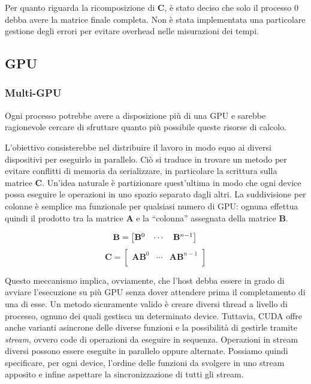 \documentclass[a4paper]{article}
\begin{document}
Per quanto riguarda la ricomposizione di $\mathbf{C}$, è stato deciso che solo il processo 0 debba avere la matrice finale completa.
Non è stata implementata una particolare gestione degli errori per evitare overhead nelle misurazioni dei tempi.

\subsection{GPU}
\subsubsection{Multi-GPU}
Ogni processo potrebbe avere a disposizione più di una GPU e sarebbe ragionevole cercare di sfruttare quanto più possibile queste risorse di calcolo.

L'obiettivo consisterebbe nel distribuire il lavoro in modo equo ai diversi dispositivi per eseguirlo in parallelo. Ciò si traduce in trovare un metodo per evitare conflitti di memoria da serializzare, in particolare la scrittura sulla matrice $\mathbf{C}$. Un'idea naturale è partizionare quest'ultima in modo che ogni device possa eseguire le operazioni in uno spazio separato dagli altri.
La suddivisione per colonne è semplice ma funzionale per qualsiasi numero di GPU: ognuna effettua quindi il prodotto tra la matrice $\mathbf{A}$ e la ``colonna'' assegnata della matrice $\mathbf{B}$.

$$
    \mathbf{B}=
    \begin{bmatrix}
        \mathbf{B}^{0} & \cdots & \mathbf{B}^{n - 1} \\
    \end{bmatrix}\\
$$
$$
    \mathbf{C}=
    \begin{bmatrix}
        \mathbf{A}\mathbf{B}^0 & \cdots & \mathbf{A}\mathbf{B}^{n-1} \\
    \end{bmatrix}
$$

Questo meccanismo implica, ovviamente, che l'host debba essere in grado di avviare l'esecuzione su più GPU senza dover attendere prima il completamento di una di esse.
Un metodo sicuramente valido è creare diversi thread a livello di processo, ognuno dei quali gestisca un determinato device.
Tuttavia, CUDA offre anche varianti asincrone delle diverse funzioni e la possibilità di gestirle tramite \textit{stream}, ovvero code di operazioni da eseguire in sequenza. Operazioni in stream diversi possono essere eseguite in parallelo oppure alternate.
Possiamo quindi specificare, per ogni device, l'ordine delle funzioni da svolgere in uno stream apposito e infine aspettare la sincronizzazione di tutti gli stream.
\end{document}
